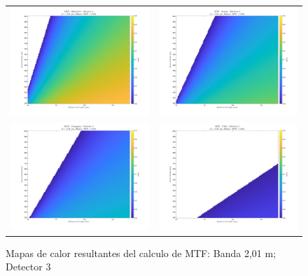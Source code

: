 \begin{landscape}
\begin{figure}[p]
\centering
\setlength{\tabcolsep}{2pt}
\renewcommand{\arraystretch}{0}

\begin{tabular}{cc}
\includegraphics[width=0.48\linewidth]{4.Payload/MTF/MTF_Lambda2_Detector3_Telescopio1_heatmap.jpg} &
\includegraphics[width=0.48\linewidth]{4.Payload/MTF/MTF_Lambda2_Detector3_Telescopio2_heatmap.jpg} \\
\includegraphics[width=0.48\linewidth]{4.Payload/MTF/MTF_Lambda2_Detector3_Telescopio3_heatmap.jpg} &
\includegraphics[width=0.48\linewidth]{4.Payload/MTF/MTF_Lambda2_Detector3_Telescopio4_heatmap.jpg} \\
\end{tabular}
\caption{Mapas de calor resultantes del calculo de MTF: Banda 2,01 \textmu m; Detector 3}
\end{figure}
\end{landscape}

